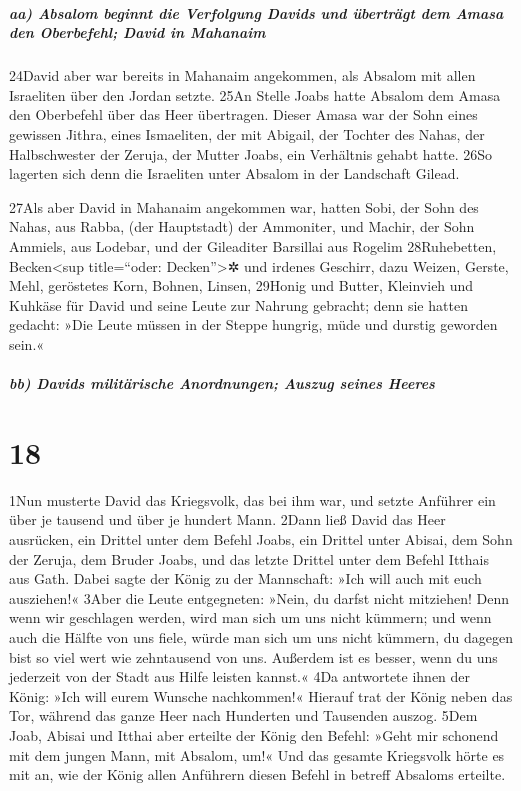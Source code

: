 \hypertarget{aa-absalom-beginnt-die-verfolgung-davids-und-uxfcbertruxe4gt-dem-amasa-den-oberbefehl-david-in-mahanaim}{%
\subparagraph{aa) Absalom beginnt die Verfolgung Davids und überträgt
dem Amasa den Oberbefehl; David in
Mahanaim}\label{aa-absalom-beginnt-die-verfolgung-davids-und-uxfcbertruxe4gt-dem-amasa-den-oberbefehl-david-in-mahanaim}}

24David aber war bereits in Mahanaim angekommen, als Absalom mit allen
Israeliten über den Jordan setzte. 25An Stelle Joabs hatte Absalom dem
Amasa den Oberbefehl über das Heer übertragen. Dieser Amasa war der Sohn
eines gewissen Jithra, eines Ismaeliten, der mit Abigail, der Tochter
des Nahas, der Halbschwester der Zeruja, der Mutter Joabs, ein
Verhältnis gehabt hatte. 26So lagerten sich denn die Israeliten unter
Absalom in der Landschaft Gilead.

27Als aber David in Mahanaim angekommen war, hatten Sobi, der Sohn des
Nahas, aus Rabba, (der Hauptstadt) der Ammoniter, und Machir, der Sohn
Ammiels, aus Lodebar, und der Gileaditer Barsillai aus Rogelim
28Ruhebetten, Becken\textless sup title=``oder: Decken''\textgreater✲
und irdenes Geschirr, dazu Weizen, Gerste, Mehl, geröstetes Korn,
Bohnen, Linsen, 29Honig und Butter, Kleinvieh und Kuhkäse für David und
seine Leute zur Nahrung gebracht; denn sie hatten gedacht: »Die Leute
müssen in der Steppe hungrig, müde und durstig geworden sein.«

\hypertarget{bb-davids-milituxe4rische-anordnungen-auszug-seines-heeres}{%
\subparagraph{bb) Davids militärische Anordnungen; Auszug seines
Heeres}\label{bb-davids-milituxe4rische-anordnungen-auszug-seines-heeres}}

\hypertarget{section-17}{%
\section{18}\label{section-17}}

1Nun musterte David das Kriegsvolk, das bei ihm war, und setzte Anführer
ein über je tausend und über je hundert Mann. 2Dann ließ David das Heer
ausrücken, ein Drittel unter dem Befehl Joabs, ein Drittel unter Abisai,
dem Sohn der Zeruja, dem Bruder Joabs, und das letzte Drittel unter dem
Befehl Itthais aus Gath. Dabei sagte der König zu der Mannschaft: »Ich
will auch mit euch ausziehen!« 3Aber die Leute entgegneten: »Nein, du
darfst nicht mitziehen! Denn wenn wir geschlagen werden, wird man sich
um uns nicht kümmern; und wenn auch die Hälfte von uns fiele, würde man
sich um uns nicht kümmern, du dagegen bist so viel wert wie zehntausend
von uns. Außerdem ist es besser, wenn du uns jederzeit von der Stadt aus
Hilfe leisten kannst.« 4Da antwortete ihnen der König: »Ich will eurem
Wunsche nachkommen!« Hierauf trat der König neben das Tor, während das
ganze Heer nach Hunderten und Tausenden auszog. 5Dem Joab, Abisai und
Itthai aber erteilte der König den Befehl: »Geht mir schonend mit dem
jungen Mann, mit Absalom, um!« Und das gesamte Kriegsvolk hörte es mit
an, wie der König allen Anführern diesen Befehl in betreff Absaloms
erteilte.

